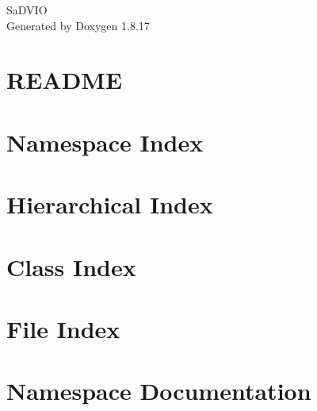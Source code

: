 \let\mypdfximage\pdfximage\def\pdfximage{\immediate\mypdfximage}\documentclass[twoside]{book}
\newcommand{\+}{\discretionary{\mbox{\scriptsize$\hookleftarrow$}}{}{}}
\newcommand{\clearemptydoublepage}{%
  \newpage{\pagestyle{empty}\cleardoublepage}%
}
\begin{document}
\hypersetup{pageanchor=false,
             bookmarksnumbered=true,
             pdfencoding=unicode
            }
\begin{titlepage}
\vspace*{7cm}
\begin{center}%
{\Large Sa\+D\+V\+IO }\\
\vspace*{1cm}
{\large Generated by Doxygen 1.8.17}\\
\end{center}
\end{titlepage}
\clearemptydoublepage
{}
\tableofcontents
\clearemptydoublepage
{}
\hypersetup{pageanchor=true}

\chapter{R\+E\+A\+D\+ME}
\label{md__home_deos_ce_8debeunne_colcon_ws_src__sa_d_v_i_o_cpp_thirdparty__e_l_s_e_d__r_e_a_d_m_e}

\chapter{Namespace Index}

\chapter{Hierarchical Index}

\chapter{Class Index}

\chapter{File Index}

\chapter{Namespace Documentation}






\end{document}
